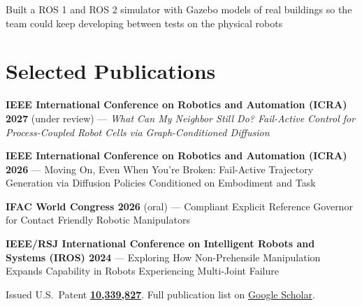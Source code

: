 \documentclass[]{deedy-resume-openfont}
\renewcommand{\sectionsep}{\vspace{3pt}}
\begin{document}
\begin{minipage}[t]{0.66\textwidth}
\begin{tightemize}
\item Built a ROS 1 and ROS 2 simulator with Gazebo models of real buildings so the team could keep developing between tests on the physical robots
\end{tightemize}
\sectionsep

\section{Selected Publications}
\vspace{0.12cm}
\begin{tightemize}
\item \textbf{IEEE International Conference on Robotics and Automation (ICRA) 2027} (under review) — \textit{What Can My Neighbor Still Do? Fail-Active Control for Process-Coupled Robot Cells via Graph-Conditioned Diffusion}
\item \textbf{IEEE International Conference on Robotics and Automation (ICRA) 2026} — Moving On, Even When You're Broken: Fail-Active Trajectory Generation via Diffusion Policies Conditioned on Embodiment and Task
\item \textbf{IFAC World Congress 2026} (oral) — Compliant Explicit Reference Governor for Contact Friendly Robotic Manipulators
\item \textbf{IEEE/RSJ International Conference on Intelligent Robots and Systems (IROS) 2024} — Exploring How Non-Prehensile Manipulation Expands Capability in Robots Experiencing Multi-Joint Failure
\end{tightemize}
Issued U.S.\ Patent \href{https://patents.google.com/patent/US10339827B2}{\textbf{10,339,827}}. Full publication list on \href{https://scholar.google.com/citations?user=6MNXSfsAAAAJ}{Google Scholar}.
\sectionsep

\end{minipage}
\end{document}
